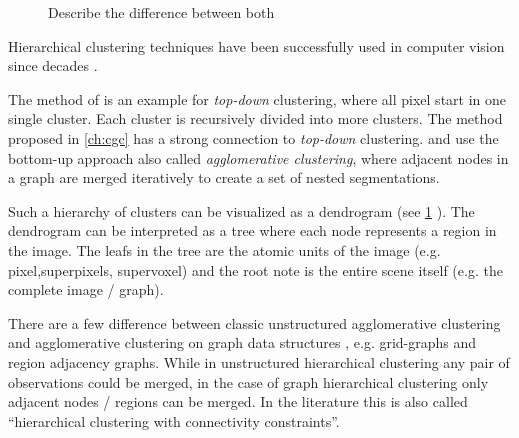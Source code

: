 \begin{figure}
{{
        }
    }
    \caption[Bottom-up vs. top-down hierarchical clustering]{
        Describe the difference between both
    }
    \label{fig:hc_bottom_up_top_down}
\end{figure}


Hierarchical clustering techniques have been successfully used
in computer vision since decades \citep{ohlander_1978_cgip,forsyth_2002_book,arbelaez_2006_cvpr,iglesias_2013,morel_1995_book}.

The method  of \citet{ohlander_1978_cgip} is an example for \emph{top-down} clustering,
where all pixel start in one single cluster. Each cluster is recursively divided 
into  more clusters. The method proposed in \cref{ch:cgc} has a strong connection to
\emph{top-down} clustering.
\citet{arbelaez_2006_cvpr} and \citet{iglesias_2013} use the bottom-up approach 
also called \emph{agglomerative clustering}, where 
adjacent nodes in a graph are merged iteratively to create 
a set of nested segmentations.


Such a hierarchy of clusters can be visualized as a dendrogram (see \cref{fig:hc_bottom_up_top_down} ).
The dendrogram can be interpreted as a tree where each node represents a
region in the image.
The leafs in the tree are the atomic units of the image (e.g. pixel,superpixels, supervoxel)
and the root note is the entire scene itself (e.g. the complete image / graph).

There are a few difference between classic unstructured agglomerative clustering
\citep{florek_1951,sokal_1958_science_bulletin,ward_63_jasa}
and agglomerative clustering on graph data structures \citep{arbelaez_2006_cvpr,iglesias_2013,morel_1995_book}, 
e.g. grid-graphs and region adjacency graphs\citep{vlachos_1993_csv}.
While in unstructured hierarchical clustering any pair of observations could be merged,
in the case of graph hierarchical clustering only adjacent nodes / regions can be merged.
In the literature this is also called ``hierarchical clustering with connectivity constraints''.


